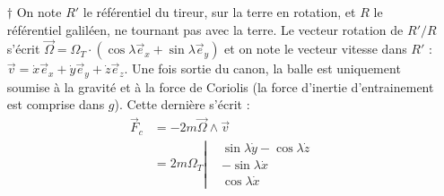 \documentclass{report}
\begin{document}
\begin{itemize}
	
	\item[$\dagger$] On note $R'$ le référentiel du tireur, sur la terre en rotation, et $R$ le référentiel galiléen, ne tournant pas avec la terre. Le vecteur rotation de $R'/R$ s'écrit $\vec{\Omega}=\Omega_T\cdot(\cos\lambda\vec{e}_x+\sin\lambda\vec{e}_y)$ et on note le vecteur vitesse dans $R'$ : $\vec{v}=\dot{x}\vec{e}_x+\dot{y}\vec{e}_y+\dot{z}\vec{e}_z$. Une fois sortie du canon, la balle est uniquement soumise à la gravité et à la force de Coriolis (la force d'inertie d'entrainement est comprise dans $g$). Cette dernière s'écrit :
	\begin{align*}
		\vec{F}_c&=-2m\vec{\Omega}\wedge\vec{v} \\
		&=2m\Omega_T\left\lvert 
      \begin{matrix} 
        &\sin\lambda\dot{y}-\cos\lambda\dot{z}\\ 
        &-\sin\lambda\dot{x} \\
         &\cos\lambda\dot{x}
      \end{matrix}  
    \right.
	\end{align*}


\end{itemize}
\end{document}
